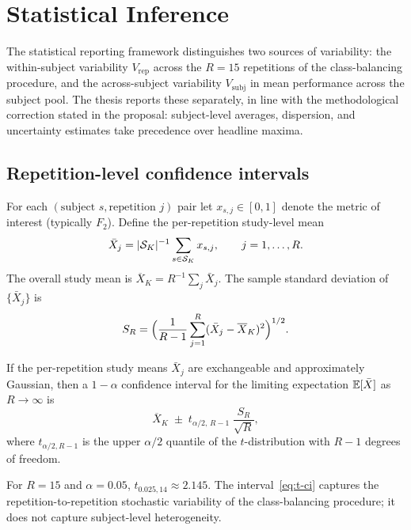 \section{Statistical Inference}
\label{subsec:stat_inference}

The statistical reporting framework distinguishes two sources of variability: the within-subject variability $V_{\mathrm{rep}}$ across the $R=15$ repetitions of the class-balancing procedure, and the across-subject variability $V_{\mathrm{subj}}$ in mean performance across the subject pool. The thesis reports these separately, in line with the methodological correction stated in the proposal: subject-level averages, dispersion, and uncertainty estimates take precedence over headline maxima.

\subsection{Repetition-level confidence intervals}
\label{subsubsec:rep-ci}

For each $(\text{subject } s,\text{repetition } j)$ pair let $x_{s,j}\in[0,1]$ denote the metric of interest (typically $F_2$). Define the per-repetition study-level mean
\[
  \bar X_j=|\mathcal{S}_K|^{-1}\sum_{s\in\mathcal{S}_K}x_{s,j},
  \qquad j=1,\ldots,R.
\]
The overall study mean is $\overline{X}_K=R^{-1}\sum_j\bar X_j$. The sample standard deviation of $\{\bar X_j\}$ is
\[
  S_R=\Bigl(\frac{1}{R-1}\sum_{j=1}^R(\bar X_j-\overline{X}_K)^2\Bigr)^{1/2}.
\]

\begin{theorem}
\label{thm:t-ci}
If the per-repetition study means $\bar X_j$ are exchangeable and approximately Gaussian, then a $1-\alpha$ confidence interval for the limiting expectation $\mathbb{E}[\bar X]$ as $R\to\infty$ is
\begin{equation}
  \overline{X}_K\;\pm\;t_{\alpha/2,\,R-1}\;\frac{S_R}{\sqrt R},
  \label{eq:t-ci}
\end{equation}
where $t_{\alpha/2,R-1}$ is the upper $\alpha/2$ quantile of the $t$-distribution with $R-1$ degrees of freedom.
\end{theorem}

For $R=15$ and $\alpha=0.05$, $t_{0.025,14}\approx 2.145$. The interval~\eqref{eq:t-ci} captures the repetition-to-repetition stochastic variability of the class-balancing procedure; it does not capture subject-level heterogeneity.

